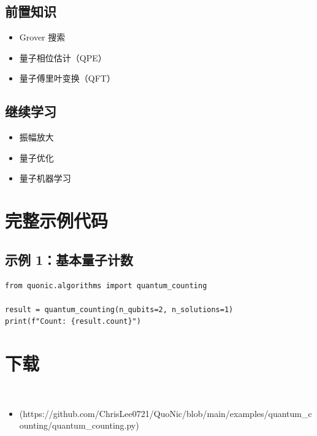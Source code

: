 \documentclass[12pt,a4paper]{article}
\begin{document}
\subsection{前置知识}
\begin{itemize}
  \item Grover 搜索
  \item 量子相位估计（QPE）
  \item 量子傅里叶变换（QFT）
\end{itemize}

\subsection{继续学习}
\begin{itemize}
  \item 振幅放大
  \item 量子优化
  \item 量子机器学习
\end{itemize}

\section{完整示例代码}

\subsection{示例 1：基本量子计数}

\begin{lstlisting}[style=python]
from quonic.algorithms import quantum_counting

result = quantum_counting(n_qubits=2, n_solutions=1)
print(f"Count: {result.count}")
\end{lstlisting}


\section{下载}

\begin{itemize}
  \item [quantum_counting.py](https://github.com/ChrisLee0721/QuoNic/blob/main/examples/quantum_counting/quantum_counting.py)
\end{itemize}
\end{document}
